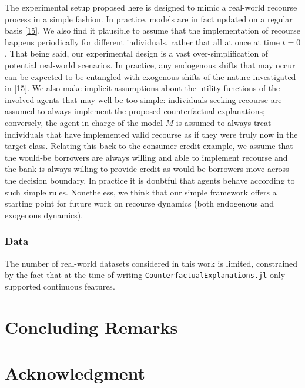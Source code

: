 \documentclass[
  conference]{IEEEtran}
\begin{document}
The experimental setup proposed here is designed to mimic a real-world
recourse process in a simple fashion. In practice, models are in fact
updated on a regular basis
\protect\hyperlink{ref-upadhyay2021towards}{{[}15{]}}. We also find it
plausible to assume that the implementation of recourse happens
periodically for different individuals, rather that all at once at time
\(t=0\). That being said, our experimental design is a vast
over-simplification of potential real-world scenarios. In practice, any
endogenous shifts that may occur can be expected to be entangled with
exogenous shifts of the nature investigated in
\protect\hyperlink{ref-upadhyay2021towards}{{[}15{]}}. We also make
implicit assumptions about the utility functions of the involved agents
that may well be too simple: individuals seeking recourse are assumed to
always implement the proposed counterfactual explanations; conversely,
the agent in charge of the model \(M\) is assumed to always treat
individuals that have implemented valid recourse as if they were truly
now in the target class. Relating this back to the consumer credit
example, we assume that the would-be borrowers are always willing and
able to implement recourse and the bank is always willing to provide
credit as would-be borrowers move across the decision boundary. In
practice it is doubtful that agents behave according to such simple
rules. Nonetheless, we think that our simple framework offers a starting
point for future work on recourse dynamics (both endogenous and
exogenous dynamics).

\hypertarget{data}{%
\subsubsection{Data}\label{data}}

The number of real-world datasets considered in this work is limited,
constrained by the fact that at the time of writing
\texttt{CounterfactualExplanations.jl} only supported continuous
features.

\hypertarget{sec-conclusion}{%
\section{Concluding Remarks}\label{sec-conclusion}}

\hypertarget{acknowledgment}{%
\section*{Acknowledgment}\label{acknowledgment}}
\end{document}

